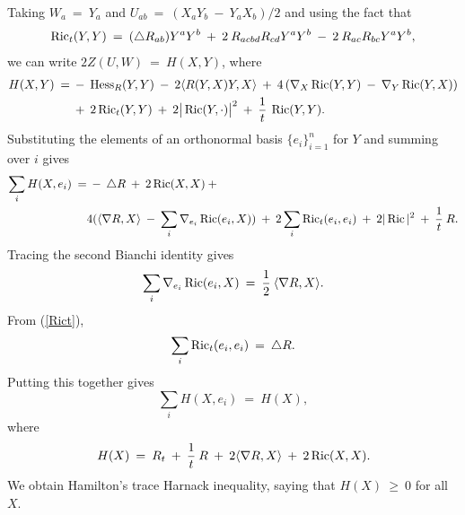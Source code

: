 Taking
$W_a \: = \: Y_a$ and $U_{ab} \: = \: (X_a Y_b \: - \:
Y_a X_b)/2$ and
using the fact that
\begin{equation} \label{Rict}
\operatorname{Ric}_t(Y, Y) \: = \: (\triangle R_{ab}) Y^a Y^b \: + \:
2 \: R_{acbd} R_{cd} Y^a Y^b \: - \: 2 \: R_{ac} R_{bc} Y^a Y^b,
\end{equation}
we can write $2Z(U, W) \: = \: H(X, Y)$, where
\begin{align} \label{Hexpression}
H(X, Y) \: = \: & - \: \operatorname{Hess}_R (Y,Y) \: - \: 2 \langle R(Y, X)Y, X \rangle
\: +\: 4 \left( \nabla_X \operatorname{Ric}(Y, Y) \: - \: \nabla_Y \operatorname{Ric}(Y, X) \right) \\
&  + \: 2 \operatorname{Ric}_t(Y, Y) \: + \: 2 \big| \operatorname{Ric}(Y, \cdot) \big|^2
\: + \: \frac{1}{t} \: \operatorname{Ric}(Y, Y). \notag
\end{align}
Substituting the elements of an orthonormal basis $\{e_i\}_{i=1}^n$ for
$Y$ and summing over $i$ gives
\begin{align}
\sum_i H(X, e_i) \: = & \: - \: \triangle R \: + \: 2 \operatorname{Ric}(X, X) \: +  \\
& 4 (\langle \nabla R, X \rangle
 \: - \: \sum_i \nabla_{e_i} \operatorname{Ric}(e_i, X)) \: + \:
2 \sum_i \operatorname{Ric}_t(e_i, e_i) \: + \: 2 |\operatorname{Ric}|^2 \: + \: \frac{1}{t} \: R.
\notag
\end{align}
Tracing the second Bianchi identity gives
\begin{equation}
\sum_i \nabla_{e_i} \operatorname{Ric}(e_i, X) \: = \:
\frac{1}{2} \: \langle \nabla R, X \rangle.
\end{equation}
From (\ref{Rict}),
\begin{equation}
\sum_i \operatorname{Ric}_t(e_i, e_i) \: = \: \triangle R.
\end{equation}
Putting this together gives
\begin{equation} \label{together}
\sum_i H(X, e_i) \: = \: H(X),
\end{equation}
where
\begin{equation} \label{Heqn}
H(X) \: = \: R_t \: + \: \frac{1}{t} \: R \: + \:
2 \langle \nabla R, X \rangle \:
+ \: 2 \operatorname{Ric}(X, X).
\end{equation}
We obtain Hamilton's trace Harnack
inequality, saying that $H(X) \: \ge \: 0$ for all $X$.

